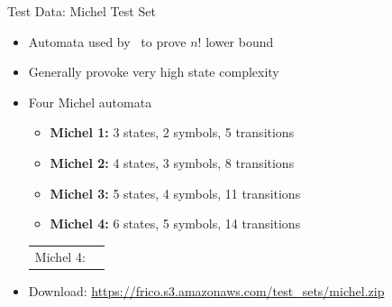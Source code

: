 \documentclass[12pt]{beamer}
\newcommand{\fat}[1]{\textbf{#1}}
\newcommand{\Michel}{
\begin{tikzpicture}[my automaton,semithick]
\scriptsize
\node[state,initial,accepting] (0)               {$q_0$};
\node[state,yshift=-0.2cm]                   (x) [below=of 0]  {$q_\#$};
\draw[->] (0) edge node[left] {\tiny\#} (x);
\draw[->] (x) edge[my below,loop] node[below] {\tiny $\#,1,2,3,4$} ();
\node[state,xshift=1cm]        (1) [right=of 0]  {$q_1$};
\draw[<->] (0) edge node[above,xshift=2mm,yshift=-0.5mm] {\tiny $1$} (1);
\draw[->] (1) edge[my right,loop] node[right] {\tiny $\#,1,2,3,4$} ();
\node[state,yshift=0.5cm]      (2) [below=of 1]  {$q_2$};
\draw[<->] (0) edge node[above,xshift=2mm,yshift=-1mm] {\tiny $2$} (2);
\draw[->] (2) edge[my right,loop] node[right] {\tiny $\#,1,2,3,4$} ();
\node[state,yshift=0.5cm]      (3) [below=of 2]  {$q_3$};
\draw[<->] (0) edge node[above,xshift=2mm,yshift=-1.5mm] {\tiny $3$} (3);
\draw[->] (3) edge[my right,loop] node[right] {\tiny $\#,1,2,3,4$} ();
\node[state,yshift=0.5cm]      (4) [below=of 3]  {$q_4$};
\draw[<->,shorten >=-0.2mm,shorten <=-0.2mm] (0) edge node[above,xshift=2mm,yshift=-2mm] {\tiny $4$} (4);
\draw[->] (4) edge[my right,loop] node[right] {\tiny $\#,1,2,3,4$} ();
\end{tikzpicture}
}
\begin{document}
\begin{frame}{Test Data: Michel Test Set}
\begin{itemize}
\item Automata used by~\cite{michel1988} to prove $n!$ lower bound
\item Generally provoke very high state complexity
\pause
\item Four Michel automata
  \begin{itemize}
  \item \fat{Michel 1:} 3 states, 2 symbols, 5 transitions
  \item \fat{Michel 2:} 4 states, 3 symbols, 8 transitions
  \item \fat{Michel 3:} 5 states, 4 symbols, 11 transitions
  \item \fat{Michel 4:} 6 states, 5 symbols, 14 transitions
  \end{itemize} \par
\pause
\centering
{\renewcommand{\tabcolsep}{0cm}
\begin{tabular}{m{1.75cm}m{7cm}}
Michel 4: & \Michel
\end{tabular}}
\pause
\par
\raggedright\vspace{-0.5mm}
\item Download: \url{https://frico.s3.amazonaws.com/test_sets/michel.zip}
\end{itemize}
\end{frame}
\end{document}
